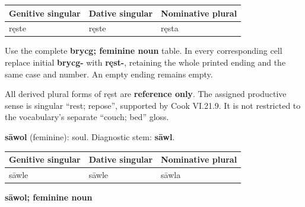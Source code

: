 \par\begingroup
\fontsize{10.5}{13.2}\selectfont
\setlength{\LTleft}{0pt}\setlength{\LTright}{\fill}
\noindent
\begin{tabular}{@{}>{\raggedright\arraybackslash}p{39.24mm}>{\raggedright\arraybackslash}p{36.31mm}>{\raggedright\arraybackslash}p{42.82mm}@{}}
\toprule
\textbf{Genitive singular} & \textbf{Dative singular} & \textbf{Nominative plural} \\
\midrule
ręste & ręste & ręsta \\
\bottomrule
\end{tabular}
\par\endgroup

Use the complete \textbf{brycg; feminine noun} table. In every corresponding cell replace initial \textbf{brycg-} with \textbf{ręst-}, retaining the whole printed ending and the same case and number. An empty ending remains empty.

All derived plural forms of ręst are \textbf{reference only}. The assigned productive sense is singular “rest; repose”, supported by Cook VI.21.9. It is not restricted to the vocabulary’s separate “couch; bed” gloss.

\textbf{sāwol} (feminine): soul. Diagnostic stem: \textbf{sāwl}.

\par\begingroup
\fontsize{10.5}{13.2}\selectfont
\setlength{\LTleft}{0pt}\setlength{\LTright}{\fill}
\noindent
\begin{tabular}{@{}>{\raggedright\arraybackslash}p{39.24mm}>{\raggedright\arraybackslash}p{36.31mm}>{\raggedright\arraybackslash}p{42.82mm}@{}}
\toprule
\textbf{Genitive singular} & \textbf{Dative singular} & \textbf{Nominative plural} \\
\midrule
sāwle & sāwle & sāwla \\
\bottomrule
\end{tabular}
\par\endgroup

\textbf{sāwol; feminine noun}

